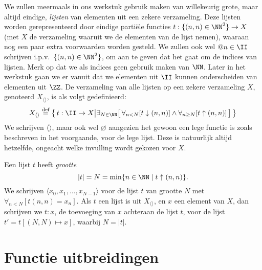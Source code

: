 We zullen meermaals in ons werkstuk gebruik maken van willekeurig grote, maar altijd eindige, \emph{lijsten} van elementen uit een zekere verzameling. Deze lijsten worden gerepresenteerd door eindige partiële functies $t : \{(n, n) \in \NN^2\} \to X$ (met $X$ de verzameling waaruit we de elementen van de lijst nemen), waaraan nog een paar extra voorwaarden worden gesteld. We zullen ook wel $@n \in \II$ schrijven i.p.v.~$\{(n, n) \in \NN^2\}$, om aan te geven dat het gaat om de indices van lijsten. Merk op dat we als indices geen gebruik maken van $\NN$. Later in het werkstuk gaan we er vanuit dat we elementen uit $\II$ kunnen onderscheiden van elementen uit $\ZZ$. De verzameling van alle lijsten op een zekere verzameling $X$, genoteerd $X_{\langle\rangle}$, is als volgt gedefinieerd:
\begin{equation*}
X_{\langle\rangle} \DEF \big\{\, t : \II \to X \big\vert \exists_{N \in \NN} \surr{ \forall_{n < N}[t \downarrow (n, n)] \land \forall_{n\ge N}[t \uparrow (n, n)] } \,\big\}
\end{equation*}
We schrijven $\langle\rangle$, maar ook wel $\varnothing$ aangezien het gewoon een lege functie is zoals beschreven in het voorgaande, voor de lege lijst. Deze is natuurlijk altijd hetzelfde, ongeacht welke invulling wordt gekozen voor $X$.

Een lijst $t$ heeft \emph{grootte}
%
\begin{equation*}
  |t| = N = \min\{n\in\NN \mid t \uparrow (n, n)\}.
\end{equation*}
%
We schrijven $\langle x_0, x_1, \dots, x_{N-1}\rangle$ voor de lijst $t$ van grootte $N$ met $\forall_{n < N}[t(n, n) = x_n]$.
Als $t$ een lijst is uit $X_{\langle\rangle}$, en $x$ een element van $X$, dan schrijven we $t:x$, de toevoeging van $x$ achteraan de lijst $t$, voor de lijst $t' = t[(N, N) \mapsto x]$, waarbij $N = |t|$.

\section{Functie uitbreidingen}
\label{sec:uitbreiden}

